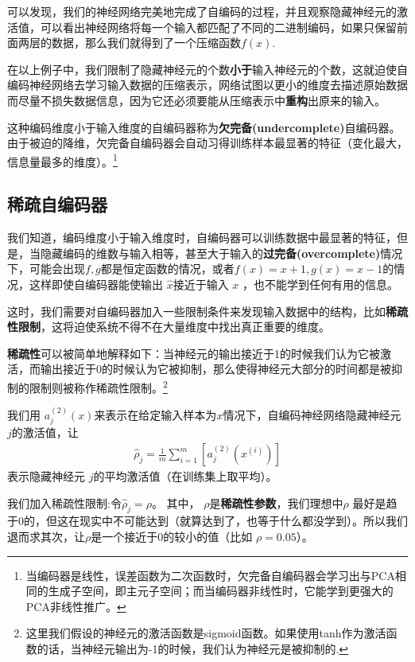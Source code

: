 可以发现，我们的神经网络完美地完成了自编码的过程，并且观察隐藏神经元的激活值，可以看出神经网络将每一个输入都匹配了不同的二进制编码，如果只保留前面两层的数据，那么我们就得到了一个压缩函数$f(x)$.

在以上例子中，我们限制了隐藏神经元的个数\textbf{小于}输入神经元的个数，这就迫使自编码神经网络去学习输入数据的压缩表示，网络试图以更小的维度去描述原始数据而尽量不损失数据信息，因为它还必须要能从压缩表示中\textbf{重构}出原来的输入。

这种编码维度小于输入维度的自编码器称为\textbf{欠完备(undercomplete)}自编码器。
由于被迫的降维，欠完备自编码器会自动习得训练样本最显著的特征（变化最大，信息量最多的维度）。\footnote{当编码器是线性，误差函数为二次函数时，欠完备自编码器会学习出与PCA相同的生成子空间，即主元子空间；而当编码器非线性时，它能学到更强大的PCA非线性推广。}

\subsection{稀疏自编码器}
我们知道，编码维度小于输入维度时，自编码器可以训练数据中最显著的特征，但是，当隐藏编码的维数与输入相等，甚至大于输入的\textbf{过完备(overcomplete)}情况下，可能会出现$f,g$都是恒定函数的情况，或者$f(x)=x+1,g(x)=x-1$的情况，这样即使自编码器能使输出 $ \hat{x} $接近于输入 $ x$ ，也不能学到任何有用的信息。

这时，我们需要对自编码器加入一些限制条件来发现输入数据中的结构，比如\textbf{稀疏性限制}，这将迫使系统不得不在大量维度中找出真正重要的维度。

\textbf{稀疏性}可以被简单地解释如下：当神经元的输出接近于1的时候我们认为它被激活，而输出接近于0的时候认为它被抑制，那么使得神经元大部分的时间都是被抑制的限制则被称作稀疏性限制。\footnote{这里我们假设的神经元的激活函数是sigmoid函数。如果使用tanh作为激活函数的话，当神经元输出为-1的时候，我们认为神经元是被抑制的.}


我们用 $ a^{(2)}_j(x) $来表示在给定输入样本为$ x $情况下，自编码神经网络隐藏神经元 $ j $的激活值，让
\begin{align}
\hat\rho_j = \frac{1}{m} \sum_{i=1}^m \left[ a^{(2)}_j(x^{(i)}) \right]
\nonumber \end{align}
表示隐藏神经元 $ j $的平均激活值（在训练集上取平均）。

我们加入稀疏性限制:令$\hat\rho_j = \rho$。
其中， $ \rho $是\textbf{稀疏性参数}，我们理想中$\rho $
最好是趋于0的，但这在现实中不可能达到（就算达到了，也等于什么都没学到）。所以我们退而求其次，让$ \rho $是一个接近于0的较小的值（比如 $ \rho = 0.05 $）。

